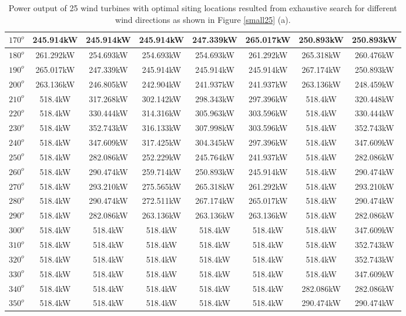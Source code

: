 \begin{table}[H]
\begin{tabular}{|c|c|c|c|c|c|c|c|}
		$170^o$	& 245.914kW	& 245.914kW	& 245.914kW	& 247.339kW	& 265.017kW	& 250.893kW	& 250.893kW	\\ \hline
		$180^o$	& 261.292kW	& 254.693kW	& 254.693kW	& 254.693kW	& 261.292kW	& 265.318kW	& 260.476kW	\\ \hline
		$190^o$	& 265.017kW	& 247.339kW	& 245.914kW	& 245.914kW	& 245.914kW	& 267.174kW	& 250.893kW	\\ \hline
		$200^o$	& 263.136kW	& 246.805kW	& 242.904kW	& 241.937kW	& 241.937kW	& 263.136kW	& 248.459kW	\\ \hline
		$210^o$	& 518.4kW	& 317.268kW	& 302.142kW	& 298.343kW	& 297.396kW	& 518.4kW	& 320.448kW	\\ \hline
		$220^o$	& 518.4kW	& 330.444kW	& 314.316kW	& 305.963kW	& 303.596kW	& 518.4kW	& 330.444kW	\\ \hline
		$230^o$	& 518.4kW	& 352.743kW	& 316.133kW	& 307.998kW	& 303.596kW	& 518.4kW	& 352.743kW	\\ \hline
		$240^o$	& 518.4kW	& 347.609kW	& 317.425kW	& 304.345kW	& 297.396kW	& 518.4kW	& 347.609kW	\\ \hline
		$250^o$	& 518.4kW	& 282.086kW	& 252.229kW	& 245.764kW	& 241.937kW	& 518.4kW	& 282.086kW	\\ \hline
		$260^o$	& 518.4kW	& 290.474kW	& 259.714kW	& 250.893kW	& 245.914kW	& 518.4kW	& 290.474kW	\\ \hline
		$270^o$	& 518.4kW	& 293.210kW	& 275.565kW	& 265.318kW	& 261.292kW	& 518.4kW	& 293.210kW	\\ \hline
		$280^o$	& 518.4kW	& 290.474kW	& 272.511kW	& 267.174kW	& 265.017kW	& 518.4kW	& 290.474kW	\\ \hline
		$290^o$	& 518.4kW	& 282.086kW	& 263.136kW	& 263.136kW	& 263.136kW	& 518.4kW	& 282.086kW	\\ \hline
		$300^o$	& 518.4kW	& 518.4kW	& 518.4kW	& 518.4kW	& 518.4kW	& 518.4kW	& 347.609kW	\\ \hline
		$310^o$	& 518.4kW	& 518.4kW	& 518.4kW	& 518.4kW	& 518.4kW	& 518.4kW	& 352.743kW	\\ \hline
		$320^o$	& 518.4kW	& 518.4kW	& 518.4kW	& 518.4kW	& 518.4kW	& 518.4kW	& 352.743kW	\\ \hline
		$330^o$	& 518.4kW	& 518.4kW	& 518.4kW	& 518.4kW	& 518.4kW	& 518.4kW	& 347.609kW	\\ \hline
		$340^o$	& 518.4kW	& 518.4kW	& 518.4kW	& 518.4kW	& 518.4kW	& 282.086kW	& 282.086kW	\\ \hline
		$350^o$	& 518.4kW	& 518.4kW	& 518.4kW	& 518.4kW	& 518.4kW	& 290.474kW	& 290.474kW	\\ \hline
        	\end{tabular}
        	\caption{Power output of 25 wind turbines with optimal siting locations resulted from exhaustive search for different wind directions as shown in Figure \ref{small25} (a).}
        	\label{table25a}
        \end{table}
